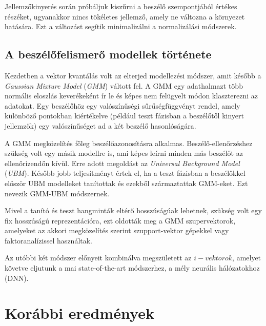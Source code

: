 Jellemzőkinyerés során próbáljuk kiszűrni a beszélő szempontjából értékes részéket, ugyanakkor nincs tökéletes jellemző, amely ne változna a környezet hatására. Ezt a változást segítik minimalizálni a normalizálási módszerek.

\subsection{A beszélőfelismerő modellek története}

Kezdetben a vektor kvantálás volt az elterjed modellezési módszer, amit később a \emph{Gaussian Mixture Model} (\emph{GMM}) váltott fel. A GMM egy adathalmazt több normális eloszlás keverékeként ír le és képes nem felügyelt módon klaszterezni az adatokat. Egy beszélőhöz egy valószínűségi sűrűségfüggvényt rendel, amely különböző pontokban kiértékelve (például teszt fázisban a beszélőtől kinyert jellemzők) egy valószínűséget ad a két beszélő hasonlóságára.

A GMM megközelítés főleg beszélőazonosításra alkalmas. Beszélő-ellenőrzéshez szükség volt egy másik modellre is, ami képes leírni minden más beszélőt az ellenőrizendőn kívül. Erre adott megoldást az \emph{Universal Background Model} (\emph{UBM}). Később jobb teljesítményt értek el, ha a teszt fázisban a beszélőkkel először UBM modelleket tanítottak és ezekből származtattak GMM-eket. Ezt nevezik GMM-UBM módszernek.

Mivel a tanító és teszt hangminták eltérő hosszúságúak lehetnek, szükség volt egy fix hosszúságú reprezentációra, ezt oldották meg a GMM szupervektorok, amelyeket az akkori megközelítés szerint szupport-vektor gépekkel vagy faktoranalízissel használtak.

Az utóbbi két módszer előnyeit kombinálva megszületett az $i-vektorok$, amelyet követve eljutunk a mai state-of-the-art módszerhez, a mély neurális hálózatokhoz (DNN).

\section{Korábbi eredmények}



